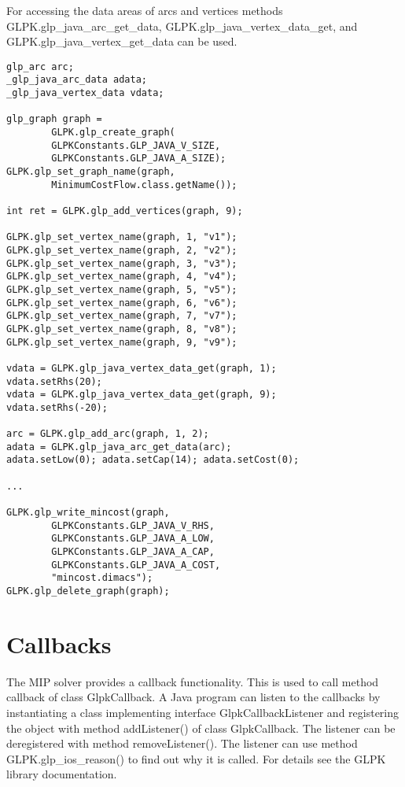 \documentclass[a4paper,11pt]{report}
\begin{document}
For accessing the data areas of arcs and vertices methods
GLPK.glp\_java\_arc\_get\_data,\linebreak
GLPK.glp\_java\_vertex\_data\_get, and
GLPK.glp\_java\_vertex\_get\_data can be used.

\begin{lstlisting}
glp_arc arc;
_glp_java_arc_data adata;
_glp_java_vertex_data vdata;

glp_graph graph =
        GLPK.glp_create_graph(
        GLPKConstants.GLP_JAVA_V_SIZE,
        GLPKConstants.GLP_JAVA_A_SIZE);
GLPK.glp_set_graph_name(graph,
        MinimumCostFlow.class.getName());

int ret = GLPK.glp_add_vertices(graph, 9);

GLPK.glp_set_vertex_name(graph, 1, "v1");
GLPK.glp_set_vertex_name(graph, 2, "v2");
GLPK.glp_set_vertex_name(graph, 3, "v3");
GLPK.glp_set_vertex_name(graph, 4, "v4");
GLPK.glp_set_vertex_name(graph, 5, "v5");
GLPK.glp_set_vertex_name(graph, 6, "v6");
GLPK.glp_set_vertex_name(graph, 7, "v7");
GLPK.glp_set_vertex_name(graph, 8, "v8");
GLPK.glp_set_vertex_name(graph, 9, "v9");
           
vdata = GLPK.glp_java_vertex_data_get(graph, 1);
vdata.setRhs(20);
vdata = GLPK.glp_java_vertex_data_get(graph, 9);
vdata.setRhs(-20);
        
arc = GLPK.glp_add_arc(graph, 1, 2);
adata = GLPK.glp_java_arc_get_data(arc);
adata.setLow(0); adata.setCap(14); adata.setCost(0);

...

GLPK.glp_write_mincost(graph, 
        GLPKConstants.GLP_JAVA_V_RHS,
        GLPKConstants.GLP_JAVA_A_LOW,
        GLPKConstants.GLP_JAVA_A_CAP,
        GLPKConstants.GLP_JAVA_A_COST,
        "mincost.dimacs");
GLPK.glp_delete_graph(graph);

\end{lstlisting}

\section{Callbacks}
The MIP solver provides a callback functionality. This is used to call
method callback of class GlpkCallback. A Java program can listen to the
callbacks by instantiating a class implementing interface
GlpkCallbackListener and registering the object with method addListener()
of class GlpkCallback. The listener can be deregistered with method
removeListener(). The listener can use method GLPK.glp\_ios\_reason() to find
out why it is called. For details see the GLPK library documentation.
\end{document}
